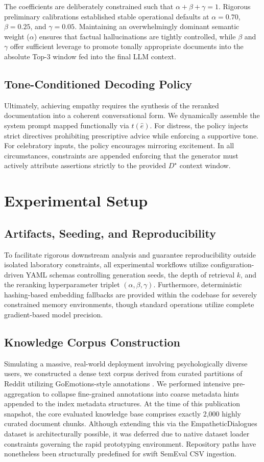 \documentclass[conference]{IEEEtran}
\begin{document}
The coefficients are deliberately constrained such that $\alpha + \beta + \gamma = 1$. Rigorous preliminary calibrations established stable operational defaults at $\alpha = 0.70$, $\beta = 0.25$, and $\gamma = 0.05$. Maintaining an overwhelmingly dominant semantic weight ($\alpha$) ensures that factual hallucinations are tightly controlled, while $\beta$ and $\gamma$ offer sufficient leverage to promote tonally appropriate documents into the absolute Top-3 window fed into the final LLM context.

\subsection{Tone-Conditioned Decoding Policy}
Ultimately, achieving empathy requires the synthesis of the reranked documentation into a coherent conversational form. We dynamically assemble the system prompt mapped functionally via $t(\hat{e})$. For distress, the policy injects strict directives prohibiting prescriptive advice while enforcing a supportive tone. For celebratory inputs, the policy encourages mirroring excitement. In all circumstances, constraints are appended enforcing that the generator must actively attribute assertions strictly to the provided $D^\star$ context window.


\section{Experimental Setup}

\subsection{Artifacts, Seeding, and Reproducibility}
To facilitate rigorous downstream analysis and guarantee reproducibility outside isolated laboratory constraints, all experimental workflows utilize configuration-driven YAML schemas controlling generation seeds, the depth of retrieval $k$, and the reranking hyperparameter triplet $(\alpha, \beta, \gamma)$. Furthermore, deterministic hashing-based embedding fallbacks are provided within the codebase for severely constrained memory environments, though standard operations utilize complete gradient-based model precision.

\subsection{Knowledge Corpus Construction}
Simulating a massive, real-world deployment involving psychologically diverse users, we constructed a dense text corpus derived from curated partitions of Reddit utilizing GoEmotions-style annotations \cite{2}. We performed intensive pre-aggregation to collapse fine-grained annotations into coarse metadata hints appended to the index metadata structures. At the time of this publication snapshot, the core evaluated knowledge base comprises exactly 2,000 highly curated document chunks. Although extending this via the EmpatheticDialogues dataset \cite{3} is architecturally possible, it was deferred due to native dataset loader constraints governing the rapid prototyping environment. Repository paths have nonetheless been structurally predefined for swift SemEval CSV ingestion.
\end{document}
